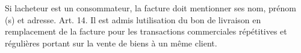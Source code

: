 \documentclass[edit,12pt,a4paper,ChapStyle,oneside,doubleinterligne]{report}
\begin{document}
Si lacheteur est un consommateur, la facture doit mentionner ses nom, prénom (s) et adresse.
\newline
Art. 14.  Il est admis lutilisation du bon de livraison en
 remplacement de la facture  pour les transactions
 commerciales répétitives et régulières portant sur la vente
 de biens à un même client\cite{journal80}.


\printbibliography %
\end{document}
